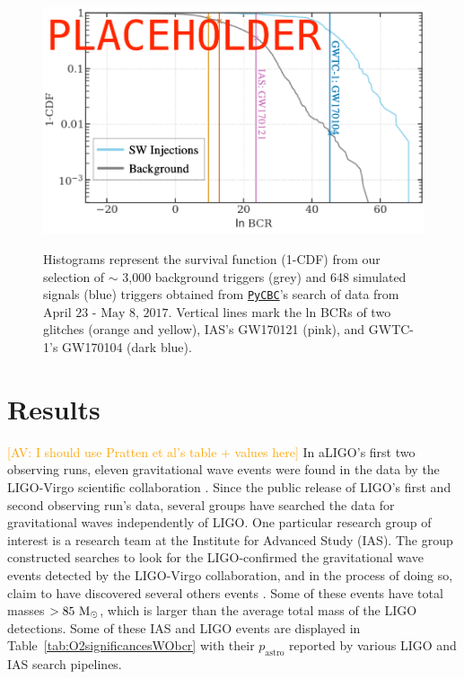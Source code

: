 \documentclass[%
 amsmath,amssymb,
 aps,
twocolumn
]{revtex4}
\newcommand{\pycbc}{{\sc \href{https://pycbc.org/}{\texttt{PyCBC}}}\xspace}
\newcommand{\mathcmd}[1]{{\sc \relax\ifmmode#1\else $#1$\fi}\xspace}
\newcommand{\msun}{\mathcmd{\text{M}_\odot}}
\newcommand{\pastro}{\relax\ifmmode{p_\text{astro}}\else $p_\text{astro}$\fi\xspace}
\newcommand{\av}[1]{\textcolor{orange}{[AV: #1]}}
\begin{document}
\begin{figure}[!h]
{\centering \includegraphics[width=0.75\linewidth]{images/bcr_cdf} }
\caption[BCR distribution example]{Histograms represent the survival function (1-CDF) from our selection of $\sim$ 3,000 background triggers (grey) and 648 simulated signals (blue) triggers obtained from \pycbc's search of data from $\text{April 23 - May 8, 2017}$. Vertical lines mark the ln BCRs of two glitches (orange and yellow), IAS's GW170121 (pink), and GWTC-1's GW170104 (dark blue).}\label{fig:bcrCdf}
\end{figure}






\section{\label{sec:Results}Results}
\av{I should use Pratten et al's table + values here}
In aLIGO's first two observing runs, eleven gravitational wave events were found in the data by the LIGO-Virgo scientific collaboration \citep{abbott2019gwtc}. Since the public release of LIGO's first and second observing run's data, several groups have searched the data for gravitational waves independently of LIGO. One particular research group of interest is a research team at the Institute for Advanced Study (IAS). The group constructed searches to look for the LIGO-confirmed the gravitational wave events detected by the LIGO-Virgo collaboration, and in the process of doing so, claim to have discovered several others events \citep{IAS0, IAS1, IAS2}. Some of these events have total masses $>85\ \msun$, which is larger than the average total mass of the LIGO detections. Some of these IAS and LIGO events are displayed in Table~\ref{tab:O2significancesWObcr} with their \pastro reported by various LIGO and IAS search pipelines.
\end{document}
